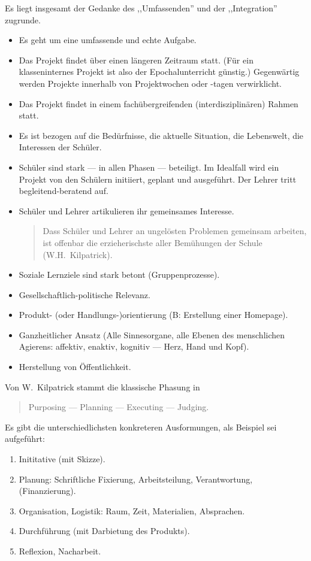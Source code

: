 Es liegt insgesamt der Gedanke des ,,Umfassenden'' und der
,,Integration'' zugrunde.
\begin{itemize}
\item
Es geht um eine umfassende und echte Aufgabe.
\item
Das Projekt findet \"{u}ber einen l\"{a}ngeren Zeitraum statt.
(F\"{u}r ein klasseninternes Projekt ist also der
Epochalunterricht g\"{u}nstig.)
Gegenw\"{a}rtig werden Projekte innerhalb von Projektwochen
oder -tagen verwirklicht.
\item
Das Projekt findet in einem fach\"{u}bergreifenden
(interdisziplin\"{a}ren) Rahmen statt.
\item
Es ist bezogen auf die Bed\"{u}rfnisse, die aktuelle Situation, die
Lebenswelt, die    Interessen der Sch\"{u}ler.
\item
Sch\"{u}ler sind stark --- in allen Phasen --- beteiligt.
Im Idealfall wird ein Projekt von den Sch\"{u}lern initiiert, geplant
und ausgef\"{u}hrt.
Der Lehrer tritt begleitend-beratend auf.
\item
Sch\"{u}ler und Lehrer artikulieren ihr gemeinsames Interesse.
\begin{quote}
Dass Sch\"{u}ler und Lehrer an ungel\"{o}sten Problemen gemeinsam
arbeiten, ist offenbar die erzieherischste aller Bem\"{u}hungen der
Schule (W.H.\ Kilpatrick).
\end{quote}
\item
Soziale Lernziele sind stark betont (Gruppenprozesse).
\item
Gesellschaftlich-politische Relevanz.
\item
Produkt- (oder Handlungs-)orientierung (B: Erstellung einer Homepage).
\item
Ganzheitlicher Ansatz (Alle Sinnesorgane, alle Ebenen des
menschlichen Agierens: affektiv, enaktiv, kognitiv --- Herz,
Hand und Kopf).
\item
Herstellung von \"{O}ffentlichkeit.
\end{itemize}


Von W.\ Kilpatrick stammt die klassische Phasung in
\begin{quote}
Purposing --- Planning --- Executing --- Judging.
\end{quote}

Es gibt die unterschiedlichsten konkreteren Ausformungen, als Beispiel sei
aufgef\"{u}hrt:
\begin{enumerate}
\item
Inititative (mit Skizze).
\item
Planung: Schriftliche Fixierung, Arbeitsteilung, Verantwortung,
(Finanzierung).
\item
Organisation, Logistik: Raum, Zeit, Materialien, Absprachen.
\item
Durchf\"{u}hrung (mit Darbietung des Produkts).
\item
Reflexion, Nacharbeit.
\end{enumerate}

